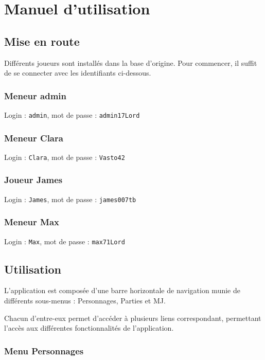 \documentclass[a4paper, 11pt, titlepage]{article}
\begin{document}
\section {Manuel d'utilisation}

\subsection {Mise en route}

Différents joueurs sont installés dans la base d'origine.
Pour commencer, il suffit de se connecter avec les identifiants ci-dessous.

\subsubsection {Meneur admin}

Login : \lstinline!admin!, mot de passe : \lstinline!admin17Lord!


\subsubsection {Meneur Clara}

Login : \lstinline!Clara!, mot de passe : \lstinline!Vasto42!


\subsubsection {Joueur James}

Login : \lstinline!James!, mot de passe : \lstinline!james007tb!


\subsubsection {Meneur Max}

Login : \lstinline!Max!, mot de passe : \lstinline!max71Lord!




\subsection {Utilisation}

L'application est composée d'une barre horizontale de navigation munie de différents sous-menus : Personnages, Parties et MJ.

Chacun d'entre-eux permet d'accéder à plusieurs liens correspondant, permettant l'accès aux différentes fonctionnalités de l'application.


\subsubsection {Menu Personnages}
\end{document}

